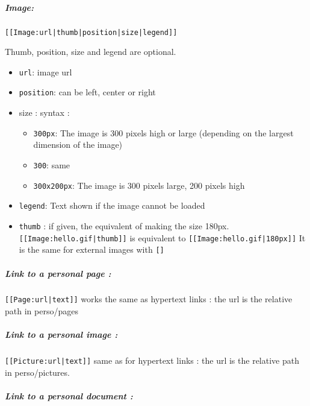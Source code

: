 \documentclass{article}
\begin{document}
		 \subparagraph{Image:}
\begin{verbatim}
[[Image:url|thumb|position|size|legend]]
\end{verbatim}
Thumb, position, size and legend are optional.
		       \begin{itemize}
			\item \verb|url|: image url
			\item \verb|position|: can be left, center or right
			\item size : syntax :  
			      \begin{itemize}
			       \item \verb|300px|: 
			       The image is 300 pixels high or large (depending on the largest dimension of the image)
			       \item \verb|300|: same
			       \item \verb|300x200px|: The image is 300 pixels large, 200 pixels high
			      \end{itemize}
			\item \verb|legend|: Text shown if the image cannot be loaded
			\item \verb|thumb| : if given, the equivalent of making the size 180px. 
			      \verb?[[Image:hello.gif|thumb]]? is equivalent to 
			      \verb?[[Image:hello.gif|180px]]?
		It is the same for external images with \verb|[]|
		       \end{itemize}
		       
		 \subparagraph{Link to a personal page : }
		 \verb?[[Page:url|text]]? works the same as hypertext links : the url is the relative path in perso/pages
		\subparagraph{Link to a personal image :}
		
		\verb?[[Picture:url|text]]? same as for hypertext links : the url is the relative path in perso/pictures.
		 \subparagraph{Link to a personal document :}
		 
\end{document}
